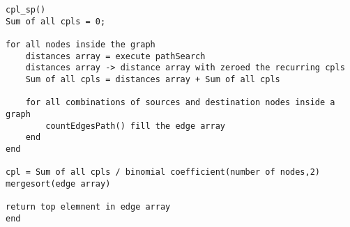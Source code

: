 \documentclass{article}
\begin{document}
\begin{lstlisting}
cpl_sp()
Sum of all cpls = 0;

for all nodes inside the graph
	distances array = execute pathSearch
	distances array -> distance array with zeroed the recurring cpls
	Sum of all cpls = distances array + Sum of all cpls
	
	for all combinations of sources and destination nodes inside a graph
		countEdgesPath() fill the edge array
	end 
end

cpl = Sum of all cpls / binomial coefficient(number of nodes,2)
mergesort(edge array)

return top elemnent in edge array
end
\end{lstlisting}\bigbreak
\end{document}
